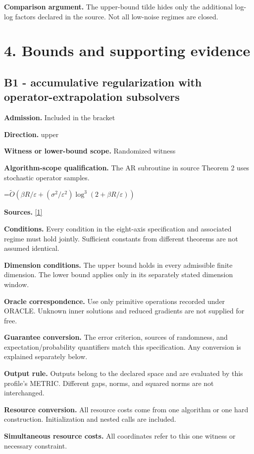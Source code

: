 \documentclass[10pt,a4paper]{article}
\newcommand{\AtlasMath}[1]{\par\begingroup\centering\setbox0=\hbox{$\displaystyle #1$}\ifdim\wd0>1.4\linewidth\typeout{ATLAS WIDE FORMULA: \the\wd0}\fi\ifdim\wd0>\linewidth\resizebox{\linewidth}{!}{\box0}\else\box0\fi\par\endgroup}
\begin{document}
\textbf{Comparison argument.} The upper-bound tilde hides only the additional log-log factors declared in the source. Not all low-noise regimes are closed.

\section{4. Bounds and supporting evidence}
\subsection{B1 - accumulative regularization with operator-extrapolation subsolvers}
\textbf{Admission.} Included in the bracket

\textbf{Direction.} upper

\textbf{Witness or lower-bound scope.} Randomized witness

\textbf{Algorithm-scope qualification.} The AR subroutine in source Theorem 2 uses stochastic operator samples.

\AtlasMath{\widetilde{O}(\beta R/\varepsilon+(\sigma^2/\varepsilon^2)\log^3(2+\beta R/\varepsilon))}
\textbf{Sources.} \href{https://arxiv.org/pdf/2609.04188v2}{[1]}

\textbf{Conditions.} Every condition in the eight-axis specification and associated regime must hold jointly. Sufficient constants from different theorems are not assumed identical.

\textbf{Dimension conditions.} The upper bound holds in every admissible finite dimension. The lower bound applies only in its separately stated dimension window.

\textbf{Oracle correspondence.} Use only primitive operations recorded under ORACLE. Unknown inner solutions and reduced gradients are not supplied for free.

\textbf{Guarantee conversion.} The error criterion, sources of randomness, and expectation/probability quantifiers match this specification. Any conversion is explained separately below.

\textbf{Output rule.} Outputs belong to the declared space and are evaluated by this profile's METRIC. Different gaps, norms, and squared norms are not interchanged.

\textbf{Resource conversion.} All resource costs come from one algorithm or one hard construction. Initialization and nested calls are included.

\textbf{Simultaneous resource costs.} All coordinates refer to this one witness or necessary constraint.
\end{document}
